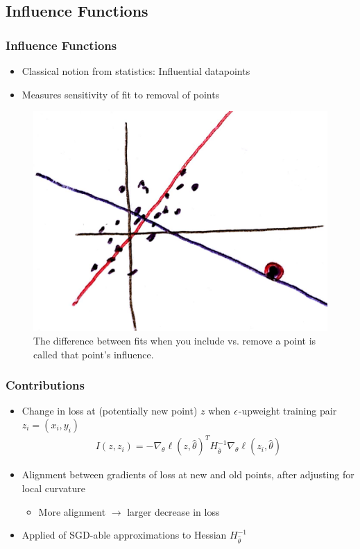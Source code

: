 \documentclass[10pt,mathserif]{beamer}
\begin{document}
\subsection{Influence Functions}

\begin{frame}
  \frametitle{Influence Functions}
  \begin{itemize}
  \item Classical notion from statistics: Influential datapoints
  \item Measures sensitivity of fit to removal of points
  \end{itemize} 
  \begin{figure}[ht]
    \centering
    \includegraphics[width=0.55\paperwidth]{figure/classical_influence}
    \caption{The difference between fits when you include vs. remove a point is
      called that point's influence.\label{fig:classical_influence} }
\end{figure}
\end{frame}

\begin{frame}
  \frametitle{Contributions}
  \begin{itemize}
  \item Change in loss at (potentially new point) $z$ when $\epsilon$-upweight
    training pair $z_i = \left(x_i, y_i\right)$
    \begin{align*}
    I\left(z, z_i\right) = -\nabla_{\theta} \ell\left(z, \hat{\theta}\right)^{T} H^{-1}_{\hat{\theta}} \nabla_{\theta} \ell\left(z_i, \hat{\theta}\right)
    \end{align*}
  \item Alignment between gradients of loss at new and old points, after
    adjusting for local curvature 
    \begin{itemize}
    \item More alignment $\rightarrow$ larger decrease in loss
    \end{itemize}
  \item Applied of SGD-able approximations to Hessian $H^{-1}_{\hat{\theta}}$
  \end{itemize}
\end{frame}
\end{document}
